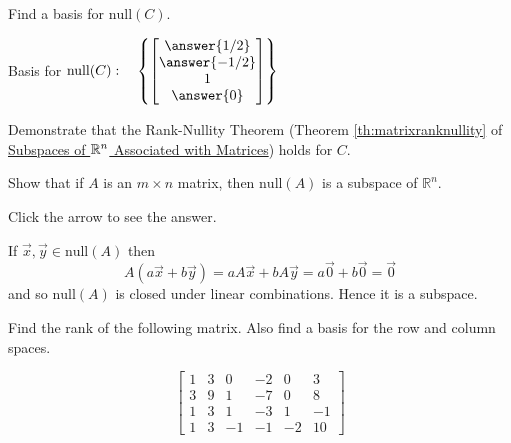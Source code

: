 \documentclass{ximera}
\begin{document}
\begin{problem}
\begin{problem}\label{prob:nullABC3}
Find a basis for $\mbox{null}(C)$.

Basis for $\mbox{null}(C):\quad \left\{ \begin{bmatrix}\answer{1/2}\\\answer{-1/2}\\1\\\answer{0}\end{bmatrix}\right\}$
\end{problem}

\begin{problem}\label{prob:rank-nullityABC3}
Demonstrate that the Rank-Nullity Theorem (Theorem \ref{th:matrixranknullity} of \href{https://ximera.osu.edu/oerlinalg/LinearAlgebra/VSP-0040/main}{Subspaces of $\mathbb{R}^n$ Associated with Matrices}) 
holds for $C$.
\end{problem}
\end{problem}




\begin{problem}\label{prb:5.31} Show that if $A$ is an $m\times n$ matrix, then $\mbox{null} \left( A\right) $
is a subspace of $\mathbb{R}^n$.

Click the arrow to see the answer.  
\begin{expandable}
If $\vec{x},\vec{y}\in \mbox{null} \left( A\right) $ then
\[
A\left( a\vec{x}+b\vec{y}\right) =aA\vec{x}+bA\vec{y}=a\vec{0}
+b\vec{0}=\vec{0}
\]
and so $\mbox{null} \left( A\right) $ is closed under linear combinations. Hence it
is a subspace.
\end{expandable}
\end{problem}

\begin{problem}\label{prb:5.32} Find the rank of the following matrix. Also find a basis for the row
and column spaces.

\begin{equation*}
\left[
\begin{array}{rrrrrr}
1 & 3 & 0 & -2 & 0 & 3 \\
3 & 9 & 1 & -7 & 0 & 8 \\
1 & 3 & 1 & -3 & 1 & -1 \\
1 & 3 & -1 & -1 & -2 & 10
\end{array}
\right]
\end{equation*}
\end{problem}
\end{document}
